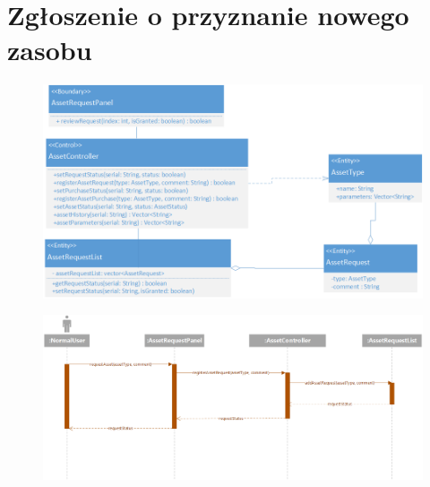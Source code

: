 \documentclass[11pt, a4paper, oneside]{report}
\begin{document}
\section{Zgłoszenie o przyznanie nowego zasobu}
\begin{figure}[H]
\centering
\includegraphics[scale=0.5]{zgloszenie_zasob_class.png}
\end{figure}
\begin{figure}[H]
\centering
\includegraphics[scale=0.5]{zgloszenie_zasob_sequence.png}
\end{figure}
\end{document}
